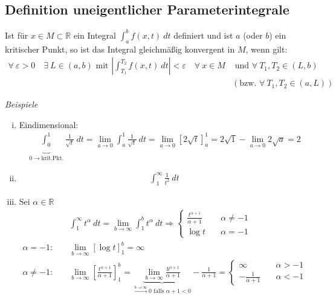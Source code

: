 \documentclass[11pt,a4paper]{book}
\newcommand {\R}	{\mathbb{R}}
\newcommand{\1}    	{\mathbbm{1}}
\newcommand{\mitt}	{\textrm{ mit }}
\begin{document}
\subsection{Definition uneigentlicher Parameterintegrale}
Ist für \(x \in M \subset \R\) ein Integral \(\int_a^b f(x,t) ~dt\) definiert und ist \(a\) (oder \(b\)) ein kritischer Punkt, so ist das Integral gleichmäßig konvergent in \(M\), wenn gilt:
\begin{align*}
	\forall~  \varepsilon > 0 \quad \exists~ L \in (a,b) \mitt
	\left\vert \int_{T_1}^{T_2} f(x,t) ~dt \right\vert < \varepsilon \quad \forall~ x \in M &\textrm{ und } \forall~ T_1, T_2 \in (L,b) \\
	&\left(\textrm{bzw. } \forall~ T_1, T_2 \in (a,L) \right)
\end{align*}

\textit{Beispiele}
\begin{enumerate}[(i)]
	\item Eindimensional: \begin{align*}
		\underbrace{\int_0^1}_{0\rightarrow\textrm{krit.Pkt.}} \frac{1}{\sqrt{t}} ~dt = \lim_{a \rightarrow 0} \int_a^1 \frac{1}{\sqrt{t}} ~dt = \lim_{a \rightarrow 0} \left[ 2 \sqrt{t} \right]_a^1 = 2\sqrt{1} - \lim_{a \rightarrow 0} 2\sqrt{a} = 2
	\end{align*}
	\item \begin{align*}
		\int_1^\infty \frac{1}{t^2} ~dt
	\end{align*}
	\item Sei \(\alpha \in \R\)
	\begin{align*}
		&\int_1^\infty t^\alpha ~dt = \lim_{b \rightarrow \infty} 
		\int_1^b t^\alpha ~dt \Rightarrow 
		\left\{ \begin{array}{ll}
			\frac{t^{\alpha+1}}{\alpha+1} &\quad \alpha \neq -1 \\
			\log t &\quad \alpha = -1
		\end{array} \right. \\
		\alpha = -1:\quad&
		\lim_{b \rightarrow \infty} \left[ \log t \right]_1^b = \infty \\
		\alpha \neq -1:\quad&
		\lim_{b \rightarrow \infty}
		\left[ \frac{t^{\alpha+1}}{\alpha+1} \right]_1^b =
		\underbrace{\lim_{b\rightarrow\infty} \frac{b^{\alpha+1}}{\alpha+1}}_{\stackrel{b\rightarrow\infty}{\rightarrow} 0 \textrm{ falls } \alpha + 1 < 0} - \frac{1}{\alpha + 1} = 
		\left\{ \begin{array}{ll}
			\infty &\quad \alpha > -1 \\
			-\frac{1}{\alpha+1} &\quad \alpha < -1
		\end{array} \right.
	\end{align*}
\end{enumerate}
\end{document}
